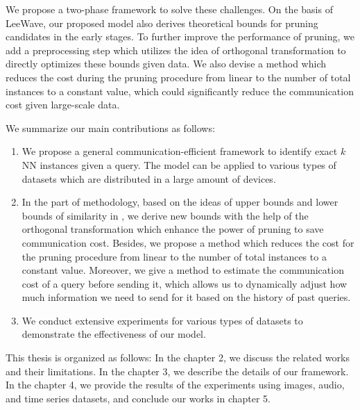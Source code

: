 
We propose a two-phase framework to solve these challenges.  On the basis of LeeWave, our proposed model also derives theoretical bounds for pruning candidates in the early stages.  To further improve the performance of pruning, we add a preprocessing step which utilizes the idea of orthogonal transformation to directly optimizes these bounds given data.  We also devise a method which reduces the cost during the pruning procedure from linear to the number of total instances to a constant value, which could significantly reduce the communication cost given large-scale data.


We summarize our main contributions as follows:
\begin{enumerate}
	\item We propose a general communication-efficient framework to identify exact $k$NN instances given a query. The model can be applied to various types of datasets which are distributed in a large amount of devices.
	\item In the part of methodology, based on the ideas of upper bounds and lower bounds of similarity in \cite{LeeWave}, we derive new bounds with the help of the orthogonal transformation which enhance the power of pruning to save communication cost.  Besides, we propose a method which reduces the cost for the pruning procedure from linear to the number of total instances to a constant value.  Moreover, we give a method to estimate the communication cost of a query before sending it, which allows us to dynamically adjust how much information we need to send for it based on the history of past queries.
	\item We conduct extensive experiments for various types of datasets to demonstrate the effectiveness of our model.
\end{enumerate}

This thesis is organized as follows: In the chapter 2, we discuss the related works and their limitations.  In the chapter 3, we describe the details of our framework. In the chapter 4, we provide the results of the experiments using images, audio, and time series datasets, and conclude our works in chapter 5.

%
%
